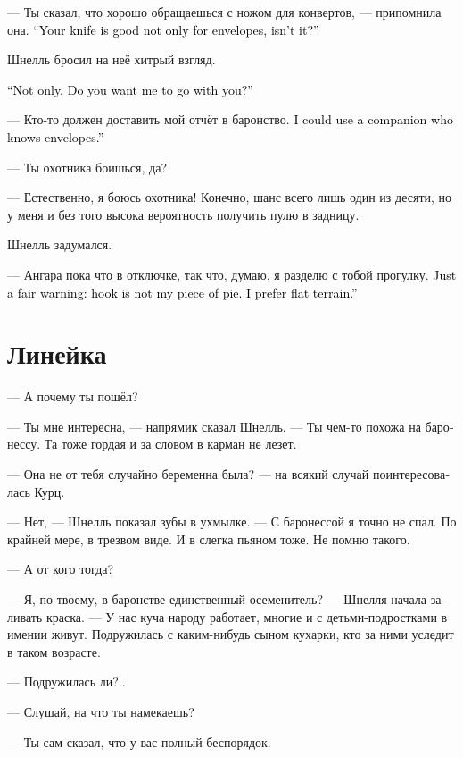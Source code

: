 \documentclass[a4paper,12pt,fleqn]{book}\usepackage{cooltooltips}\usepackage{polyglossia}\setdefaultlanguage[babelshorthands=true]{russian}\setotherlanguage{english}\defaultfontfeatures{Ligatures=TeX,Mapping=tex-text} \usepackage{xcolor}\definecolor{lightgray}{HTML}{bbbbbb}\color{lightgray}\newcommand{\ml}[3]{\textenglish{\textcolor{black}{#3}}}
\begin{document}
--- Ты сказал, что хорошо обращаешься с ножом для конвертов, --- припомнила она.
\ml{$0$}
{--- Ты ведь не только конверты режешь?}
{``Your knife is good not only for envelopes, isn't it?''}

Шнелль бросил на неё хитрый взгляд.

\ml{$0$}
{--- Не только.}
{``Not only.}
\ml{$0$}
{Ты хочешь взять меня с собой?}
{Do you want me to go with you?''}

--- Кто-то должен доставить мой отчёт в баронство.
\ml{$0$}
{Мне бы не помешал спутник, знающий толк в конвертах.}
{I could use a companion who knows envelopes.''}

--- Ты охотника боишься, да?

--- Естественно, я боюсь охотника!
Конечно, шанс всего лишь один из десяти, но у меня и без того высока вероятность получить пулю в задницу.

Шнелль задумался.

--- Ангара пока что в отключке, так что, думаю, я разделю с тобой прогулку.
\ml{$0$}
{Только хочу предупредить: хук --- это не моё.}
{Just a fair warning: hook is not my piece of pie.}
\ml{$0$}
{Предпочитаю равнинную местность.}
{I prefer flat terrain.''}

\section{Линейка}

--- А почему ты пошёл?

--- Ты мне интересна, --- напрямик сказал Шнелль.
--- Ты чем-то похожа на баронессу.
Та тоже гордая и за словом в карман не лезет.

--- Она не от тебя случайно беременна была? --- на всякий случай поинтересовалась Курц.

--- Нет, --- Шнелль показал зубы в ухмылке.
--- С баронессой я точно не спал.
По крайней мере, в трезвом виде.
И в слегка пьяном тоже.
Не помню такого.

--- А от кого тогда?

--- Я, по-твоему, в баронстве единственный осеменитель? --- Шнелля начала заливать краска.
--- У нас куча народу работает, многие и с детьми-подростками в имении живут.
Подружилась с каким-нибудь сыном кухарки, кто за ними уследит в таком возрасте.

--- Подружилась ли?..

--- Слушай, на что ты намекаешь?

--- Ты сам сказал, что у вас полный беспорядок.
\end{document}
